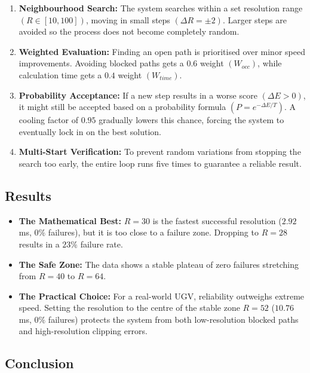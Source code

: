 \documentclass[12pt, a4paper]{article}
\begin{document}
\begin{enumerate}
    \item \textbf{Neighbourhood Search:} The system searches within a set resolution range $(R \in [10, 100])$, moving in small steps $(\Delta R = \pm 2)$. Larger steps are avoided so the process does not become completely random.

    \item \textbf{Weighted Evaluation:} Finding an open path is prioritised over minor speed improvements. Avoiding blocked paths gets a $0.6$ weight $(W_{occ})$, while calculation time gets a $0.4$ weight $(W_{time})$.

    \item \textbf{Probability Acceptance:} If a new step results in a worse score $(\Delta E > 0)$, it might still be accepted based on a probability formula $(P = e^{-\Delta E / T})$. A cooling factor of $0.95$ gradually lowers this chance, forcing the system to eventually lock in on the best solution.

    \item \textbf{Multi-Start Verification:} To prevent random variations from stopping the search too early, the entire loop runs five times to guarantee a reliable result.
\end{enumerate}

\subsection{Results}

\begin{itemize}
    \item \textbf{The Mathematical Best:} $R=30$ is the fastest successful resolution ($2.92$ ms, $0\%$ failures), but it is too close to a failure zone. Dropping to $R=28$ results in a $23\%$ failure rate.

    \item \textbf{The Safe Zone:} The data shows a stable plateau of zero failures stretching from $R=40$ to $R=64$.

    \item \textbf{The Practical Choice:} For a real-world UGV, reliability outweighs extreme speed. Setting the resolution to the centre of the stable zone $R=52$ ($10.76$ ms, $0\%$ failures) protects the system from both low-resolution blocked paths and high-resolution clipping errors.
\end{itemize}

\subsection{Conclusion}
\end{document}
